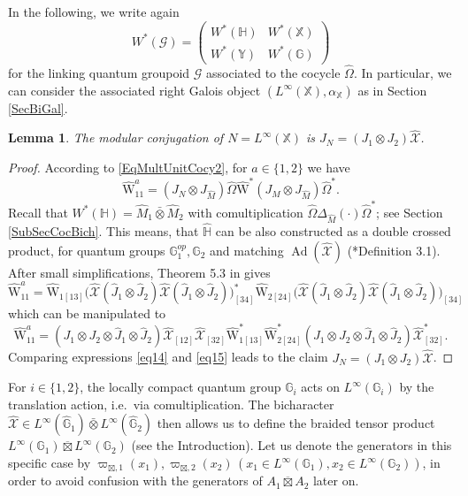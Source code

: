 \documentclass[reqno]{amsart}
\numberwithin{equation}{section}
\newtheorem{Lem}[Theorem]{Lemma}
\newcommand{\G}{\mathbb{G}}
\newcommand{\Hh}{\mathbb{H}}
\newcommand{\X}{\mathbb{X}}
\newcommand{\Y}{\mathbb{Y}}
\newcommand{\msG}{\mathscr{G}}
\newcommand{\ov}{\overline}
\newcommand{\mc}{\mathcal}
\newcommand{\wh}{\widehat}
\newcommand{\GG}{\mathbb{G}}
\newcommand{\ww}{\mathrm{W}}
\begin{document}
In the following, we write again
\[
W^*(\msG) = \begin{pmatrix} W^*(\Hh) & W^*(\X)\\ W^*(\Y) & W^*(\G)\end{pmatrix} 
\]
for the linking quantum groupoid $\msG$ associated to the cocycle $\hat{\Omega}$. In particular, we can consider the associated right Galois object $(L^{\infty}(\X),\alpha_{\X})$ as in Section \ref{SecBiGal}. 

\begin{Lem}\label{lemma1}
The modular conjugation of $N=L^{\infty}(\X)$ is $J_{N}=(J_1\otimes J_2)\wh{\mc{X}}$.
\end{Lem}

\begin{proof}
According to \eqref{EqMultUnitCocy2}, for $a\in \{1,2\}$ we have
\begin{equation}\label{eq14}
\hat{\ww}^{a}_{11}=(J_N\otimes J_{\hat{M}})\hat{\Omega}\hat{\ww}^* (J_M\otimes J_{\hat{M}})\hat{\Omega}^*.
\end{equation}
Recall that $W^*(\Hh)=\hat{M}_1\bar\otimes \hat{M}_2$ with comultiplication $\hat{\Omega}\Delta_{\hat{M}}(\cdot)\hat{\Omega}^*$; see Section \ref{SubSecCocBich}. This means, that $\hat{\Hh}$ can be also constructed as a double crossed product, for quantum groups $\G_1^{op},\G_2$ and matching $\operatorname{Ad}(\wh{\mc{X}})$ (\cite{BV05}*{Definition 3.1}). After small simplifications, Theorem 5.3 in \cite{BV05}  gives
\[
\hat{\ww}^a_{11}=
\hat{\ww}_{1 [13]}
\bigl(\wh{\mc{X}}(\hat{J}_1\otimes \hat{J}_2)
\wh{\mc{X}}(\hat{J}_1\otimes \hat{J}_2)\bigr)^*_{[34]}
\hat{\ww}_{2[24]}
\bigl(\wh{\mc{X}}(\hat{J}_1\otimes \hat{J}_2)
\wh{\mc{X}}(\hat{J}_1\otimes \hat{J}_2)\bigr)_{[34]}
\]
which can be manipulated to
\begin{equation}\label{eq15}
\hat{\ww}^a_{11}=
(J_1\otimes J_2\otimes \hat{J}_1\otimes \hat{J}_2)
\wh{\mc{X}}_{[12]}\wh{\mc{X}}_{[32]}
\hat{\ww}_{1[13]}^* \hat{\ww}_{2[24]}^*
(J_1\otimes J_2\otimes \hat{J}_1\otimes \hat{J}_2)
\wh{\mc{X}}_{[32]}^*.
\end{equation}
Comparing expressions \eqref{eq14} and \eqref{eq15} leads to the claim $J_N=(J_1\otimes J_2)\wh{\mc{X}}$.
\end{proof}

For $i\in\{1,2\}$, the locally compact quantum group $\G_i$ acts on $L^{\infty}(\G_i)$ by the translation action, i.e.\ via comultiplication. The bicharacter $\wh{\mc{X}}\in L^{\infty}(\widehat{\G}_1)\bar\otimes L^{\infty}(\widehat{\G}_2)$ then allows us to define the braided tensor product $L^{\infty}(\G_1)\ov\boxtimes L^{\infty}(\G_2)$ (see the Introduction). Let us denote the generators in this specific case by $\varpi_{\boxtimes,1}(x_1),\varpi_{\boxtimes,2}(x_2)\,(x_1\in L^{\infty}(\GG_1),x_2\in L^\infty(\GG_2))$, in order to avoid confusion with the generators of $A_1\ov\boxtimes A_2$ later on.
\end{document}
